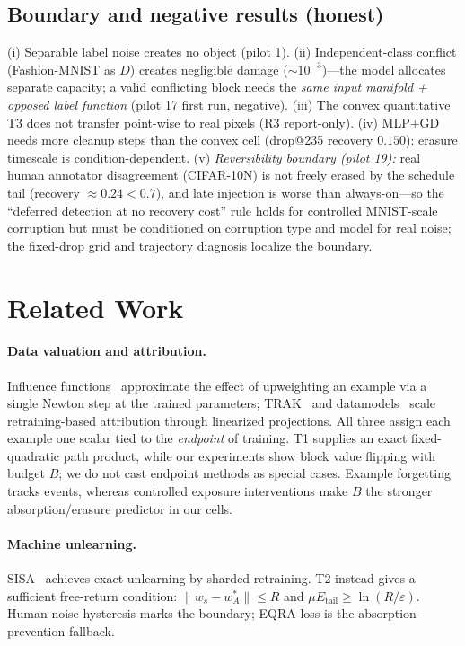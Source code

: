 \documentclass{article}
\newcommand{\B}{B}            %
\begin{document}
\subsection{Boundary and negative results (honest)}
(i) Separable label noise creates no object (pilot 1). (ii) Independent-class conflict
(Fashion-MNIST as $D$) creates negligible damage ($\sim10^{-3}$)---the model allocates separate
capacity; a valid conflicting block needs the \emph{same input manifold + opposed label function}
(pilot 17 first run, negative). (iii) The convex quantitative T3 does not transfer point-wise to
real pixels (R3 report-only). (iv) MLP+GD needs more cleanup steps than the convex cell
(drop@235 recovery $0.150$): erasure timescale is condition-dependent. (v) \emph{Reversibility
boundary (pilot 19):} real human annotator disagreement (CIFAR-10N) is not freely erased by the
schedule tail (recovery $\approx0.24<0.7$), and late injection is worse than always-on---so the
``deferred detection at no recovery cost'' rule holds for controlled MNIST-scale corruption but
must be conditioned on corruption type and model for real noise; the fixed-drop grid and
trajectory diagnosis localize the boundary.

\section{Related Work}
\label{sec:related}

\paragraph{Data valuation and attribution.} Influence
functions~\citep{koh2017understanding} approximate the effect of upweighting an example via a
single Newton step at the trained parameters; TRAK~\citep{park2023trak} and
datamodels~\citep{ilyas2022datamodels} scale retraining-based attribution through linearized
projections. All three assign each example one scalar tied to the \emph{endpoint} of training.
T1 supplies an exact fixed-quadratic path product, while our experiments show block value flipping
with budget $\B$; we do not cast endpoint methods as special cases. Example forgetting
\citep{toneva2019forgetting} tracks events, whereas controlled exposure interventions make $\B$
the stronger absorption/erasure predictor in our cells.

\paragraph{Machine unlearning.} SISA~\citep{bourtoule2021sisa} achieves exact unlearning by
sharded retraining. T2 instead gives a sufficient free-return condition:
$\|w_s-w_A^*\|\leq R$ and $\mu E_{\mathrm{tail}}\geq\ln(R/\varepsilon)$. Human-noise
hysteresis marks the boundary; EQRA-loss is the absorption-prevention fallback.
\end{document}
